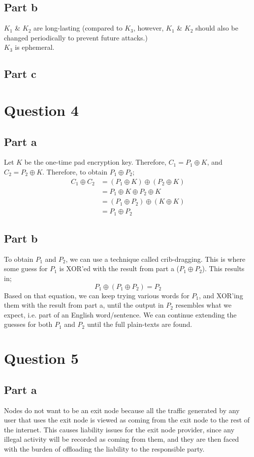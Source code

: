 \documentclass[12pt,a4paper]{article}
\begin{document}
\subsection{Part b}
\(K_1\) \& \(K_2\) are long-lasting (compared to \(K_3\), however, \(K_1\) \& \(K_2\) should also be changed periodically to prevent future attacks.)\\
\(K_3\) is ephemeral.

\subsection{Part c}

\section{Question 4}
\subsection{Part a}
Let \(K\) be the one-time pad encryption key. Therefore, \(C_1 = P_1 \oplus K\), and \(C_2 = P_2 \oplus K\).
Therefore, to obtain \(P_1 \oplus P_2\);
\begin{align*}
  C_1 \oplus C_2 &= (P_1 \oplus K) \oplus (P_2 \oplus K)\\
  &= P_1 \oplus K \oplus P_2 \oplus K\\
  &= (P_1 \oplus P_2) \oplus (K \oplus K)\\
  &= P_1 \oplus P_2
\end{align*}

\subsection{Part b}
To obtain \(P_1\) and \(P_2\), we can use a technique called crib-dragging. This is where some guess for \(P_1\) is XOR'ed with the result from part a (\(P_1 \oplus P_2\)). This results in;
\[ P_1 \oplus (P_1 \oplus P_2) = P_2 \]
Based on that equation, we can keep trying various words for \(P_1\), and XOR'ing them with the result from part a, until the output in \(P_2\) resembles what we expect, i.e. part of an English word/sentence. We can continue extending the guesses for both \(P_1\) and \(P_2\) until the full plain-texts are found.

\section{Question 5}
\subsection{Part a}
Nodes do not want to be an exit node because all the traffic generated by any user that uses the exit node is viewed as coming from the exit node to the rest of the internet. This causes liability issues for the exit node provider, since any illegal activity will be recorded as coming from them, and they are then faced with the burden of offloading the liability to the responsible party.
\end{document}
